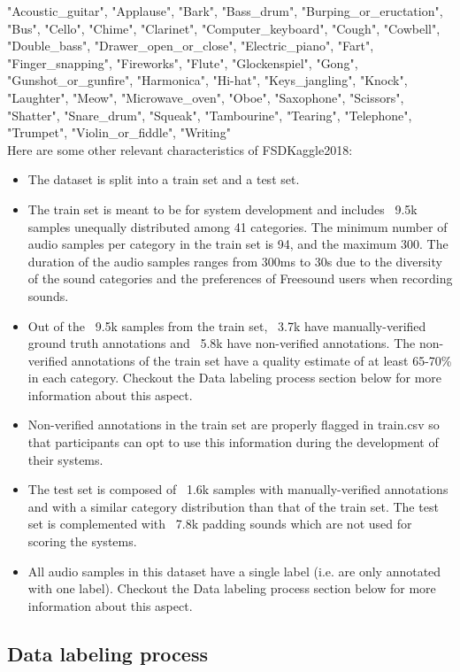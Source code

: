 \documentclass{article} %
\begin{document}
		"Acoustic\_guitar", "Applause", "Bark", "Bass\_drum", "Burping\_or\_eructation", "Bus", "Cello", "Chime", "Clarinet", "Computer\_keyboard", "Cough", "Cowbell", "Double\_bass", "Drawer\_open\_or\_close", "Electric\_piano", "Fart", "Finger\_snapping", "Fireworks", "Flute", "Glockenspiel", "Gong", "Gunshot\_or\_gunfire", "Harmonica", "Hi-hat", "Keys\_jangling", "Knock", "Laughter", "Meow", "Microwave\_oven", "Oboe", "Saxophone", "Scissors", "Shatter", "Snare\_drum", "Squeak", "Tambourine", "Tearing", "Telephone", "Trumpet", "Violin\_or\_fiddle", "Writing"\\
		\newline
		Here are some other relevant characteristics of FSDKaggle2018:
		\begin{itemize}
		    \item The dataset is split into a train set and a test set.
		    \item The train set is meant to be for system development and includes ~9.5k samples unequally distributed among 41 categories. The minimum number of audio samples per category in the train set is 94, and the maximum 300. The duration of the audio samples ranges from 300ms to 30s due to the diversity of the sound categories and the preferences of Freesound users when recording sounds.
		    \item Out of the ~9.5k samples from the train set, ~3.7k have manually-verified ground truth annotations and ~5.8k have non-verified annotations. The non-verified annotations of the train set have a quality estimate of at least 65-70\% in each category. Checkout the Data labeling process section below for more information about this aspect.
		    \item Non-verified annotations in the train set are properly flagged in train.csv so that participants can opt to use this information during the development of their systems.
		    \item The test set is composed of ~1.6k samples with manually-verified annotations and with a similar category distribution than that of the train set. The test set is complemented with ~7.8k padding sounds which are not used for scoring the systems.
		    \item All audio samples in this dataset have a single label (i.e. are only annotated with one label). Checkout the Data labeling process section below for more information about this aspect.
		\end{itemize}

	\subsection{Data labeling process}
\end{document}
